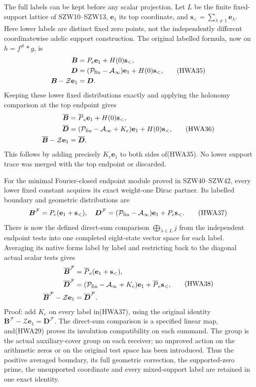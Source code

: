 \documentclass[
  10pt,
  a4paper,
]{article}
\begin{document}
The full labels can be kept before any scalar projection. Let \(L\) be
the finite fixed-support lattice of SZW10--SZW13, \(\mathbf e_1\) its
top coordinate, and
\(\mathbf s_< =\sum_{\lambda\ne1}\mathbf e_\lambda\). Here lower labels
are distinct fixed zero points, not the independently different
coordinatewise adelic support construction. The original labelled
formula, now on \(h=f^\#*g\), is \[
\begin{aligned}
\boldsymbol B&=P_e\mathbf e_1+H(0)\mathbf s_<,\\
\boldsymbol D&=(\mathcal P_{\rm fin}-\mathcal A_\infty)\mathbf e_1+H(0)\mathbf s_<,\\
\boldsymbol B-\mathcal Z\mathbf e_1&=\boldsymbol D.
\end{aligned}
\tag{HWA35}
\] Keeping these lower fixed distributions exactly and applying the
holonomy comparison at the top endpoint gives \[
\begin{aligned}
\overline{\boldsymbol B}&=\overline P_e\mathbf e_1+H(0)\mathbf s_<,\\
\overline{\boldsymbol D}&=(\mathcal P_{\rm fin}-\mathcal A_\infty+K_e)\mathbf e_1
 +H(0)\mathbf s_<,\\
\overline{\boldsymbol B}-\mathcal Z\mathbf e_1&=\overline{\boldsymbol D}.
\end{aligned}
\tag{HWA36}
\] This follows by adding precisely \(K_e\mathbf e_1\) to both sides
of(HWA35). No lower support trace was merged with the top endpoint or
discarded.

For the minimal Fourier-closed endpoint module proved in SZW40--SZW42,
every lower fixed constant acquires its exact weight-one Dirac partner.
Its labelled boundary and geometric distributions are \[
\boldsymbol B^{\mathcal F}=P_e(\mathbf e_1+\mathbf s_<),\quad
\boldsymbol D^{\mathcal F}=(\mathcal P_{\rm fin}-\mathcal A_\infty)\mathbf e_1+P_e\mathbf s_<.
\tag{HWA37}
\] There is now the defined direct-sum comparison
\(\bigoplus_{\lambda\in L}j\) from the independent endpoint tests into
one completed eight-state vector space for each label. Averaging its
native forms label by label and restricting back to the diagonal actual
scalar tests gives \[
\begin{aligned}
\overline{\boldsymbol B}^{\mathcal F}&=\overline P_e(\mathbf e_1+\mathbf s_<),\\
\overline{\boldsymbol D}^{\mathcal F}&=
(\mathcal P_{\rm fin}-\mathcal A_\infty+K_e)\mathbf e_1
 +\overline P_e\mathbf s_<,\\
\overline{\boldsymbol B}^{\mathcal F}-\mathcal Z\mathbf e_1
&=\overline{\boldsymbol D}^{\mathcal F}.
\end{aligned}
\tag{HWA38}
\] Proof: add \(K_e\) on every label in(HWA37), using the original
identity
\(\boldsymbol B^{\mathcal F}-\mathcal Z\mathbf e_1=\boldsymbol D^{\mathcal F}\).
The direct-sum comparison is a specified linear map, and(HWA29) proves
its involution compatibility on each summand. The group is the actual
auxiliary-cover group on each receiver; no unproved action on the
arithmetic zeros or on the original test space has been introduced. Thus
the positive averaged boundary, its full geometric correction, the
supported-zero prime, the unsupported coordinate and every mixed-support
label are retained in one exact identity.
\end{document}
